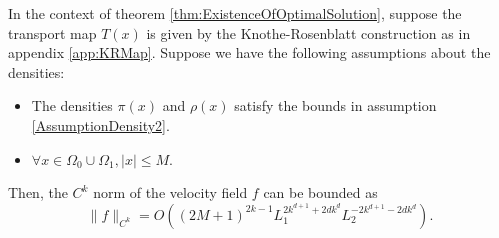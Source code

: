 \begin{theorem}
In the context of theorem \ref{thm:ExistenceOfOptimalSolution}, suppose the transport map $T(x)$ is given by the Knothe-Rosenblatt construction as in appendix \ref{app:KRMap}. Suppose we have the following assumptions about the densities:
\begin{itemize}
   \item The densities $\pi(x)$ and $\rho(x)$ satisfy the bounds in assumption \ref{AssumptionDensity2}. 
   \item $\forall x\in \Omega_0\cup\Omega_1, |x| \leq M$. 

    
    
\end{itemize}
Then, the $C^k$ norm of the velocity field $f$ can be bounded as $$\|f\|_{C^k} = O\left((2M+1)^{2k-1}L_1^{2k^{d+1}+2dk^{d}}L_2^{-2k^{d+1}-2dk^{d}}\right).$$
\end{theorem}
